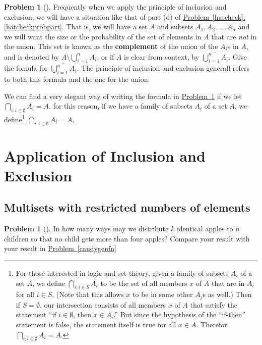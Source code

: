 \documentclass[10pt,]{book}
\newcommand{\terminology}[1]{\textbf{#1}}
\theoremstyle{plain}
\theoremstyle{definition}
\newtheorem{activity}[project]{Problem}
\theoremstyle{definition}
\numberwithin{equation}{chapter}
\begin{document}
\begin{activity}[]\marginsymbol[-1em]{} \label{compunion}
Frequently when we apply the principle of inclusion and exclusion, we will have a situation like that of part (d) of \hyperref[hatcheckprobpart]{Problem~\ref{hatcheck}.\ref{hatcheckprobpart}}.  That is, we will have a set \(A\) and subsets \(A_1, A_2, \ldots, A_n\) and we will want the size or the probability of the set of elements in \(A\) that are \emph{not} in the union.  This set is known as the \terminology{complement}  of the union of the \(A_i\)s in \(A\), and is denoted by \(A \setminus \bigcup_{i=1}^n A_i\), or if \(A\) is clear from context, by \(\overline{\bigcup_{i=1}^n A_i}\). Give the fomula for \(\overline{\bigcup_{i=1}^n A_i}\).  The principle of inclusion and exclusion generall refers to both this formula and the one for the union.%
\end{activity}
We can find a very elegant way of writing the formula in \hyperref[compunion]{Problem~\ref{compunion}} if we let \(\bigcap_{i:i\in\emptyset}A_i = A\).  for this reason, if we have a family of subsets \(A_i\) of a set \(A\), we define\footnote{For those interested in logic and set theory, given a family of subsets \(A_i\) of a set \(A\), we define \(\bigcap_{i:i\in S}A_i\) to be the set of all members \(x\) of \(A\) that are in \(A_i\) for all \(i \in S\).  (Note that this allows \(x\) to be in some other \(A_j\)s as well.)  Then if \(S = \emptyset\), our intersection consists of all members \(x\) of \(A\) that satisfy the statement ``if \(i\in \emptyset\), then \(x \in A_i\).'' But since the hypothesis of the ``if-then'' statement is false, the statement itself is true for all \(x \in A\).  Therefor \(\bigcap_{i:i \in \emptyset}A_i = A\).\label{fn-16}} \(\bigcap_{i:i\in\emptyset}A_i = A\).%
\typeout{************************************************}
\typeout{************************************************}
\section[{Application of Inclusion and Exclusion}]{Application of Inclusion and Exclusion}\label{sec_inclexcl-apps}
\typeout{************************************************}
\typeout{************************************************}
\subsection[{Multisets with restricted numbers of elements}]{Multisets with restricted numbers of elements}\label{subsection-54}
\begin{activity}[]\marginsymbol[-1em]{} \label{activity-235}
In how many ways may we distribute \(k\) identical apples to \(n\) children so that no child gets more than four apples? Compare your result with your result in \hyperref[candygenfn]{Problem~\ref{candygenfn}}%
\end{activity}
\typeout{************************************************}
\typeout{************************************************}
\end{document}
